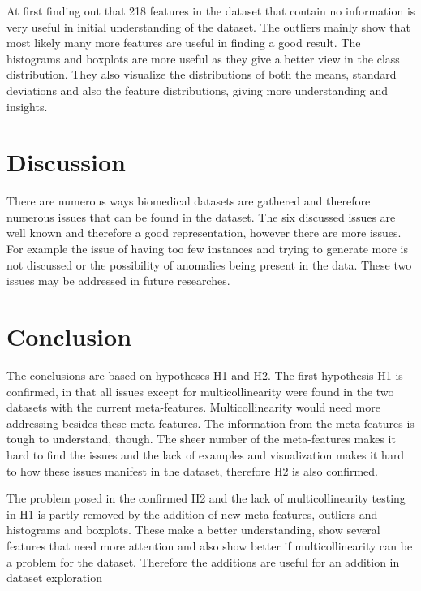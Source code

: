 \documentclass[10pt,a4paper]{report}
\begin{document}
	At first finding out that 218 features in the dataset that contain no information is very useful in initial understanding of the dataset. The outliers mainly show that most likely many more features are useful in finding a good result. The histograms and boxplots are more useful as they give a better view in the class distribution. They also visualize the distributions of both the means, standard deviations and also the feature distributions, giving more understanding and insights.
	
	\section{Discussion}
	\label{DEsec:Discussion}
	
	There are numerous ways biomedical datasets are gathered and therefore numerous issues that can be found in the dataset. The six discussed issues are well known and therefore a good representation, however there are more issues. For example the issue of having too few instances and trying to generate more is not discussed or the possibility of anomalies being present in the data. These two issues may be addressed in future researches.
	
	
	\section{Conclusion}
	\label{DEsec:Conclusions}
	
	The conclusions are based on hypotheses H1 and H2. The first hypothesis H1 is confirmed, in that all issues except for multicollinearity were found in the two datasets with the current meta-features. Multicollinearity would need more addressing besides these meta-features. The information from the meta-features is tough to understand, though. The sheer number of the meta-features makes it hard to find the issues and the lack of examples and visualization makes it hard to how these issues manifest in the dataset, therefore H2 is also confirmed.
	
	The problem posed in the confirmed H2 and the lack of multicollinearity testing in H1 is partly removed by the addition of new meta-features, outliers and histograms and boxplots. These make a better understanding, show several features that need more attention and also show better if multicollinearity can be a problem for the dataset. Therefore the additions are useful for an addition in dataset exploration
	
\end{document}
